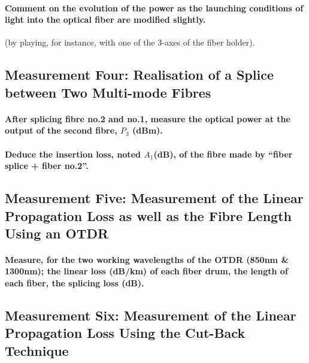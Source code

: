 \documentclass[colorlinks,11pt,a4paper,normalphoto,withhyper,ragged2e]{altareport}
\begin{document}
\paragraph{Comment on the evolution of the power as the launching conditions of light into the optical fiber are modified slightly.} (by playing, for instance, with one of the 3-axes of the fiber holder).



\subsection{Measurement Four: Realisation of a Splice between Two Multi-mode Fibres}

\paragraph{After splicing fibre no.2 and no.1, measure the optical power at the output of the second fibre, $P_3$ (dBm).}

\paragraph{Deduce the insertion loss, noted $A_1$(dB), of the fibre made by ``fiber splice + fiber no.2''.}



\subsection{Measurement Five: Measurement of the Linear Propagation Loss as well as the Fibre Length Using an OTDR}

\paragraph{Measure, for the two working wavelengths of the OTDR (850nm \& 1300nm); the linear loss (dB/km) of each fiber drum, the length of each fiber, the splicing loss (dB).}



\subsection{Measurement Six: Measurement of the Linear Propagation Loss Using the Cut-Back Technique}
\end{document}
